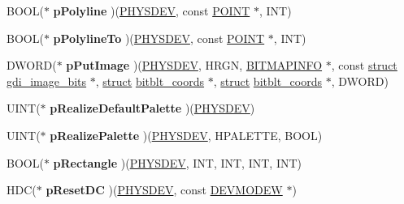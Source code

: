 \begin{DoxyCompactItemize}
B\+O\+OL($\ast$ {\bfseries p\+Polyline} )(\hyperlink{structgdi__physdev}{P\+H\+Y\+S\+D\+EV}, const \hyperlink{structtag_p_o_i_n_t}{P\+O\+I\+NT} $\ast$, I\+NT)
\item 
\mbox{\label{structgdi__dc__funcs_ac87b62159841a3e7e33b1935c054303e}} 
B\+O\+OL($\ast$ {\bfseries p\+Polyline\+To} )(\hyperlink{structgdi__physdev}{P\+H\+Y\+S\+D\+EV}, const \hyperlink{structtag_p_o_i_n_t}{P\+O\+I\+NT} $\ast$, I\+NT)
\item 
\mbox{\label{structgdi__dc__funcs_ac3e282eae7898c23eacfa106b46356b9}} 
D\+W\+O\+RD($\ast$ {\bfseries p\+Put\+Image} )(\hyperlink{structgdi__physdev}{P\+H\+Y\+S\+D\+EV}, H\+R\+GN, \hyperlink{structtag_b_i_t_m_a_p_i_n_f_o}{B\+I\+T\+M\+A\+P\+I\+N\+FO} $\ast$, const \hyperlink{interfacestruct}{struct} \hyperlink{structgdi__image__bits}{gdi\+\_\+image\+\_\+bits} $\ast$, \hyperlink{interfacestruct}{struct} \hyperlink{structbitblt__coords}{bitblt\+\_\+coords} $\ast$, \hyperlink{interfacestruct}{struct} \hyperlink{structbitblt__coords}{bitblt\+\_\+coords} $\ast$, D\+W\+O\+RD)
\item 
\mbox{\label{structgdi__dc__funcs_a52a26988c3ce8f4cc7e9477e79336b6c}} 
U\+I\+NT($\ast$ {\bfseries p\+Realize\+Default\+Palette} )(\hyperlink{structgdi__physdev}{P\+H\+Y\+S\+D\+EV})
\item 
\mbox{\label{structgdi__dc__funcs_ab6ae965078d270a9059eff233b7a0028}} 
U\+I\+NT($\ast$ {\bfseries p\+Realize\+Palette} )(\hyperlink{structgdi__physdev}{P\+H\+Y\+S\+D\+EV}, H\+P\+A\+L\+E\+T\+TE, B\+O\+OL)
\item 
\mbox{\label{structgdi__dc__funcs_ad67e419cedc59085fd20ece3886829cc}} 
B\+O\+OL($\ast$ {\bfseries p\+Rectangle} )(\hyperlink{structgdi__physdev}{P\+H\+Y\+S\+D\+EV}, I\+NT, I\+NT, I\+NT, I\+NT)
\item 
\mbox{\label{structgdi__dc__funcs_acb1c6713afa7d6a7c3f18a640e19fa21}} 
H\+DC($\ast$ {\bfseries p\+Reset\+DC} )(\hyperlink{structgdi__physdev}{P\+H\+Y\+S\+D\+EV}, const \hyperlink{struct__devicemode_w}{D\+E\+V\+M\+O\+D\+EW} $\ast$)
\item 
\mbox{\label{structgdi__dc__funcs_a4437bd172b5be9964c602895308ad5b6}} 

\end{DoxyCompactItemize}

